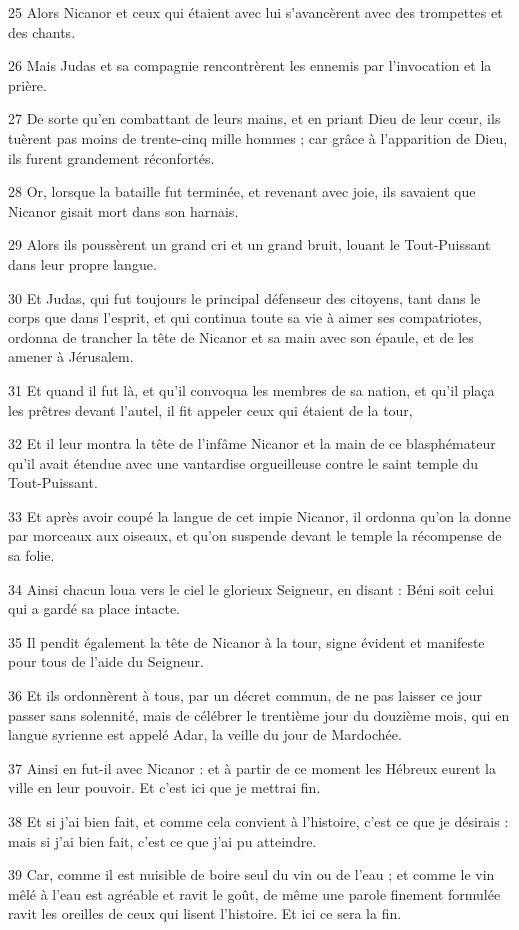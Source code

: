 \par 25 Alors Nicanor et ceux qui étaient avec lui s'avancèrent avec des trompettes et des chants.
\par 26 Mais Judas et sa compagnie rencontrèrent les ennemis par l'invocation et la prière.
\par 27 De sorte qu'en combattant de leurs mains, et en priant Dieu de leur cœur, ils tuèrent pas moins de trente-cinq mille hommes ; car grâce à l'apparition de Dieu, ils furent grandement réconfortés.
\par 28 Or, lorsque la bataille fut terminée, et revenant avec joie, ils savaient que Nicanor gisait mort dans son harnais.
\par 29 Alors ils poussèrent un grand cri et un grand bruit, louant le Tout-Puissant dans leur propre langue.
\par 30 Et Judas, qui fut toujours le principal défenseur des citoyens, tant dans le corps que dans l'esprit, et qui continua toute sa vie à aimer ses compatriotes, ordonna de trancher la tête de Nicanor et sa main avec son épaule, et de les amener à Jérusalem.
\par 31 Et quand il fut là, et qu'il convoqua les membres de sa nation, et qu'il plaça les prêtres devant l'autel, il fit appeler ceux qui étaient de la tour,
\par 32 Et il leur montra la tête de l'infâme Nicanor et la main de ce blasphémateur qu'il avait étendue avec une vantardise orgueilleuse contre le saint temple du Tout-Puissant.
\par 33 Et après avoir coupé la langue de cet impie Nicanor, il ordonna qu'on la donne par morceaux aux oiseaux, et qu'on suspende devant le temple la récompense de sa folie.
\par 34 Ainsi chacun loua vers le ciel le glorieux Seigneur, en disant : Béni soit celui qui a gardé sa place intacte.
\par 35 Il pendit également la tête de Nicanor à la tour, signe évident et manifeste pour tous de l'aide du Seigneur.
\par 36 Et ils ordonnèrent à tous, par un décret commun, de ne pas laisser ce jour passer sans solennité, mais de célébrer le trentième jour du douzième mois, qui en langue syrienne est appelé Adar, la veille du jour de Mardochée.
\par 37 Ainsi en fut-il avec Nicanor : et à partir de ce moment les Hébreux eurent la ville en leur pouvoir. Et c'est ici que je mettrai fin.
\par 38 Et si j'ai bien fait, et comme cela convient à l'histoire, c'est ce que je désirais : mais si j'ai bien fait, c'est ce que j'ai pu atteindre.
\par 39 Car, comme il est nuisible de boire seul du vin ou de l'eau ; et comme le vin mêlé à l'eau est agréable et ravit le goût, de même une parole finement formulée ravit les oreilles de ceux qui lisent l'histoire. Et ici ce sera la fin.

